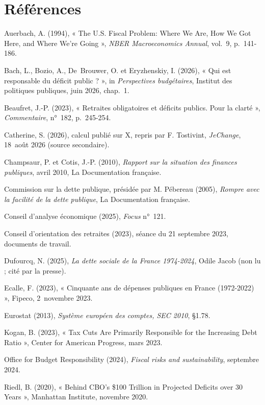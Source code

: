 \documentclass[11pt,a4paper]{article}
\begin{document}
\section*{Références}
\begin{small}\setlength{\parskip}{3pt}\raggedright
Auerbach, A. (1994), « The U.S. Fiscal Problem: Where We Are, How We Got Here, and Where
We're Going », \emph{NBER Macroeconomics Annual}, vol.~9, p.~141-186.

Bach, L., Bozio, A., De~Brouwer, O. et Eryzhenskiy, I. (2026), « Qui est responsable du déficit
public ? », in \emph{Perspectives budgétaires}, Institut des politiques publiques, juin 2026, chap.~1.

Beaufret, J.-P. (2023), « Retraites obligatoires et déficits publics. Pour la clarté »,
\emph{Commentaire}, n°~182, p.~245-254.

Catherine, S. (2026), calcul publié sur X, repris par F. Tostivint, \emph{JeChange}, 18~août
2026 (source secondaire).

Champsaur, P. et Cotis, J.-P. (2010), \emph{Rapport sur la situation des finances publiques},
avril 2010, La Documentation française.

Commission sur la dette publique, présidée par M. Pébereau (2005), \emph{Rompre avec la
facilité de la dette publique}, La Documentation française.

Conseil d'analyse économique (2025), \emph{Focus} n°~121.

Conseil d'orientation des retraites (2023), séance du 21 septembre 2023, documents de travail.

Dufourcq, N. (2025), \emph{La dette sociale de la France 1974-2024}, Odile Jacob (non lu ; cité
par la presse).

Ecalle, F. (2023), « Cinquante ans de dépenses publiques en France (1972-2022) », Fipeco,
2~novembre 2023.

Eurostat (2013), \emph{Système européen des comptes, SEC 2010}, §1.78.

Kogan, B. (2023), « Tax Cuts Are Primarily Responsible for the Increasing Debt Ratio », Center
for American Progress, mars 2023.

Office for Budget Responsibility (2024), \emph{Fiscal risks and sustainability}, septembre 2024.

Riedl, B. (2020), « Behind CBO's \$100 Trillion in Projected Deficits over 30 Years », Manhattan
Institute, novembre 2020.
\end{small}
\end{document}
